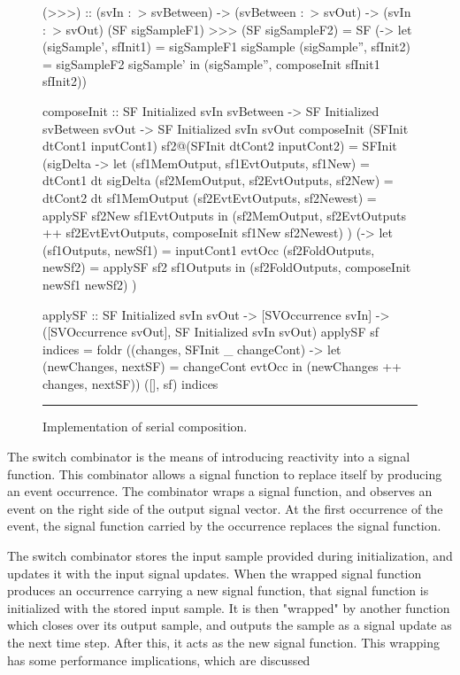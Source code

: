 \documentclass[draft]{llncs}
\begin{document}
\begin{figure}
\begin{code}
(>>>) ::    (svIn :~> svBetween) 
         -> (svBetween :~> svOut)
         -> (svIn :~> svOut)
(SF sigSampleF1) >>> (SF sigSampleF2) =
  SF (\sigSample -> let (sigSample', sfInit1) = sigSampleF1 sigSample
                        (sigSample'', sfInit2) = sigSampleF2 sigSample'
                    in (sigSample'', composeInit sfInit1 sfInit2))

composeInit ::     SF Initialized svIn svBetween
                -> SF Initialized svBetween svOut
                -> SF Initialized svIn svOut
composeInit (SFInit dtCont1 inputCont1) sf2@(SFInit dtCont2 inputCont2) =
  SFInit
    (\dt sigDelta -> 
       let (sf1MemOutput, sf1EvtOutputs, sf1New) = dtCont1 dt sigDelta
           (sf2MemOutput, sf2EvtOutputs, sf2New) = dtCont2 dt sf1MemOutput
           (sf2EvtEvtOutputs, sf2Newest) = applySF sf2New sf1EvtOutputs
       in (sf2MemOutput,
           sf2EvtOutputs ++ sf2EvtEvtOutputs,
           composeInit sf1New sf2Newest)
    )
    (\evtOcc -> 
      let (sf1Outputs, newSf1) = inputCont1 evtOcc
          (sf2FoldOutputs, newSf2) = applySF sf2 sf1Outputs
      in (sf2FoldOutputs, composeInit newSf1 newSf2)   
    )

applySF ::    SF Initialized svIn svOut
           -> [SVOccurrence svIn]
           -> ([SVOccurrence svOut],
               SF Initialized svIn svOut)
applySF sf indices =
  foldr (\evtOcc (changes, SFInit _ changeCont) ->
           let (newChanges, nextSF) = changeCont evtOcc
               in (newChanges ++ changes, nextSF))
        ([], sf)
        indices
\end{code}
\hrule
\caption{Implementation of serial composition.}
\label{figure:serial_composition_implementation}
\end{figure}

The switch combinator is the means of introducing reactivity into a signal
function. This combinator allows a signal function to replace itself by
producing an event occurrence. The combinator wraps a signal function, and 
observes an event on the right side of the output signal vector. At the first
occurrence of the event, the signal function carried by the occurrence replaces
the signal function. 

The switch combinator stores the input sample provided during initialization,
and updates it with the input signal updates. When the wrapped signal function
produces an occurrence carrying a new signal function, that signal function is
initialized with the stored input sample. It is then "wrapped" by another
function which closes over its output sample, and outputs the sample as a signal
update as the next time step. After this, it acts as the new signal function.
This wrapping has some performance implications, which are discussed 
\end{document}
